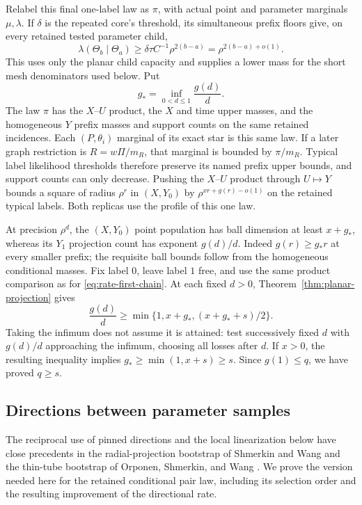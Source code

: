 Relabel this final one-label law as $\pi$, with actual point and
parameter marginals $\mu,\lambda$.  If $\delta$ is the repeated core's
threshold, its simultaneous prefix floors give, on every retained
tested parameter child,
\begin{equation}
 \lambda(\Theta_b\mid\Theta_a)
 \ge\delta\tau C^{-1}\rho^{2(b-a)}
 =\rho^{2(b-a)+o(1)}.
 \label{eq:rate-parameter-capacity-floor}
\end{equation}
This uses only the planar child capacity and supplies a lower mass
for the short mesh denominators used below.  Put
\[
 g_*=\inf_{0<d\le1}\frac{g(d)}d.
\]
The law $\pi$ has the $X$--$U$ product, the $X$ and time upper
masses, and the homogeneous $Y$ prefix masses and support counts
on the same retained incidences.  Each $(P,\theta_i)$ marginal of
its exact star is this same law.  If a later graph restriction is
$R=w\Pi/m_R$, that marginal is bounded by $\pi/m_R$.
Typical label likelihood thresholds therefore preserve its named
prefix upper bounds, and support counts can only decrease.
Pushing the $X$--$U$ product through $U\mapsto Y$ bounds a square
of radius $\rho^r$ in $(X,Y_0)$ by
$\rho^{xr+g(r)-o(1)}$ on the retained typical labels.
Both replicas use the profile of this one law.

At precision $\rho^d$, the $(X,Y_0)$ point population has ball
dimension at least $x+g_*$, whereas its $Y_1$ projection count has
exponent $g(d)/d$. Indeed $g(r)\ge g_*r$ at every smaller prefix;
the requisite ball bounds follow from the homogeneous conditional
masses. Fix label $0$, leave label $1$ free, and use the same product
comparison as for \eqref{eq:rate-first-chain}. At each fixed $d>0$,
Theorem~\ref{thm:planar-projection} gives
\[
 \frac{g(d)}d\ge\min\{1,x+g_*,(x+g_*+s)/2\}.
\]
Taking the infimum does not assume it is attained: test successively
fixed $d$ with $g(d)/d$ approaching the infimum, choosing all losses
after $d$. If $x>0$, the resulting inequality implies
$g_*\ge\min(1,x+s)\ge s$. Since $g(1)\le q$, we have proved
$q\ge s$.

\subsection{Directions between parameter samples}

The reciprocal use of pinned directions and the local linearization
below have close precedents in the radial-projection bootstrap of
Shmerkin and Wang and the thin-tube bootstrap of Orponen, Shmerkin,
and Wang \citep{ShmerkinWang2025Distance,OrponenShmerkinWang2024Radial}.
We prove the version needed here for the retained conditional pair law,
including its selection order and the resulting improvement of the
directional rate.

